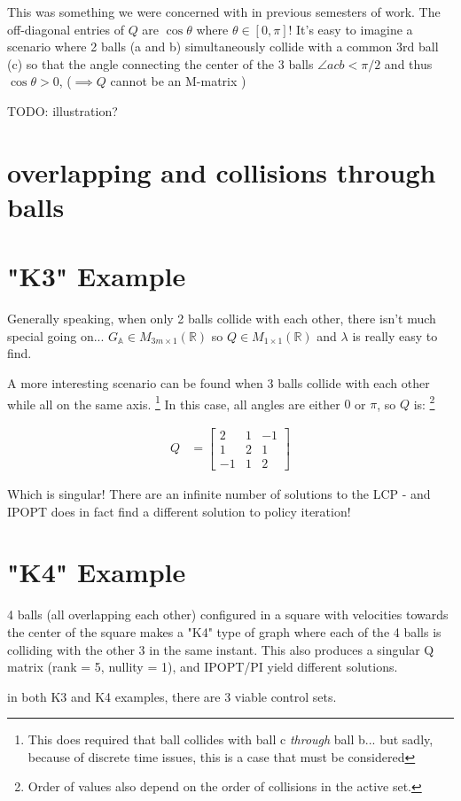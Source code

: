 \documentclass[12pt]{article}
\newcommand{\bigA}{{\mathbb{A}}}
\newcommand{\realm}[2]{ M_{#1 \times #2}(\mathbb{R})}
\begin{document}
This was something we were concerned with in previous semesters of work.
The off-diagonal entries of $Q$ are $\cos \theta$ where $\theta \in [0, \pi]$!
It's easy to imagine a scenario where 2 balls (a and b) 
simultaneously collide with a common 3rd ball (c) so that the angle
connecting the center of the 3 balls $\angle acb < \pi / 2$
and thus $\cos \theta > 0$, ($\implies Q$ cannot be an M-matrix )

TODO: illustration?

\section{overlapping and collisions through balls}

\section{"K3" Example}

Generally speaking, when only 2 balls collide with each other, there isn't much
special going on... $G_\bigA \in \realm{3m}{1}$ so $Q \in \realm{1}{1}$ and $\lambda$ is
really easy to find.

A more interesting scenario can be found when 3 balls collide with each other while all on the same axis.
\footnote{
    This does required that ball collides with ball c \textit{through} ball b... but sadly, because of discrete
    time issues, this is a case that must be considered
}
In this case, all angles are either $0$ or $\pi$, so $Q$ is:
\footnote{Order of values also depend on the order of collisions in the active set.}

\begin{align*}
Q
    &= \begin{bmatrix}
        2 & 1 & -1\\
        1 & 2 & 1\\
        -1 & 1 & 2
    \end{bmatrix}
\end{align*}

Which is singular! There are an infinite number of solutions to the LCP
- and IPOPT does in fact find a different solution to policy iteration!

\section{"K4" Example}

4 balls (all overlapping each other) configured in a square with velocities
towards the center of the square makes a "K4" type of graph where each of the 4 balls
is colliding with the other 3 in the same instant.
This also produces a singular Q matrix (rank = 5, nullity = 1), and
IPOPT/PI yield different solutions.

in both K3 and K4 examples, there are 3 viable control sets.
\end{document}
